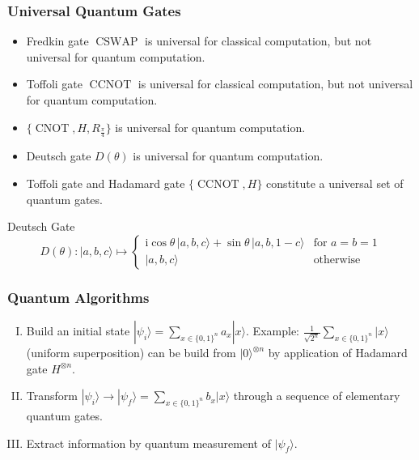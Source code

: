 \documentclass[UTF8,aspectratio=43,11pt,colorlinks,compress,openany]{beamer}%
\begin{document}
\begin{frame}\frametitle{Universal Quantum Gates}
	\begin{itemize}
		\item Fredkin gate $\operatorname{CSWAP}$ is universal for classical computation, but not universal for quantum computation.
		\item Toffoli gate $\operatorname{CCNOT}$ is universal for classical computation, but not universal for quantum computation.
		\item $\{\operatorname{CNOT},H,R_{\frac{\pi}{4}}\}$ is universal for quantum computation.
		\item Deutsch gate $D(\theta)$ is universal for quantum computation.
		\item Toffoli gate and Hadamard gate $\{\operatorname{CCNOT},H\}$ constitute a universal set of quantum gates.
	\end{itemize}
	\begin{block}{Deutsch Gate}
		\[D(\theta) : |a,b,c\rangle \mapsto \begin{cases} \mathrm{i}\cos\theta\,|a,b,c\rangle + \sin\theta\,|a,b,1-c\rangle & \mbox{for } a=b=1\\
		|a,b,c\rangle & \mbox{otherwise} \end{cases}\]
	\end{block}
\end{frame}

\begin{frame}\frametitle{Quantum Algorithms}
	\begin{enumerate}[I.]
		\item Build an initial state $|\psi_i\rangle=\sum\limits_{x\in\{0,1\}^n}a_x|x\rangle$. Example: $\frac{1}{\sqrt{2^n}}\sum\limits_{x\in\{0,1\}^n}|x\rangle$ (uniform superposition) can be build from $|0\rangle^{\otimes n}$ by application of Hadamard gate $H^{\otimes n}$.
		\item Transform $|\psi_i\rangle\to|\psi_f\rangle = \sum\limits_{x\in\{0,1\}^n} b_x|x\rangle$ through a sequence of elementary quantum gates.
		\item Extract information by quantum measurement of $|\psi_f\rangle$.
	\end{enumerate}
\end{frame}
\end{document}
